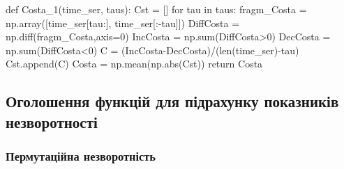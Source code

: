 \documentclass[
  letterpaper,
]{report}
\newenvironment{Shaded}{\begin{snugshade}}{\end{snugshade}}
\newcommand{\BuiltInTok}[1]{\textcolor[rgb]{0.00,0.23,0.31}{#1}}
\newcommand{\ControlFlowTok}[1]{\textcolor[rgb]{0.00,0.23,0.31}{#1}}
\newcommand{\DecValTok}[1]{\textcolor[rgb]{0.68,0.00,0.00}{#1}}
\newcommand{\KeywordTok}[1]{\textcolor[rgb]{0.00,0.23,0.31}{#1}}
\newcommand{\NormalTok}[1]{\textcolor[rgb]{0.00,0.23,0.31}{#1}}
\newcommand{\OperatorTok}[1]{\textcolor[rgb]{0.37,0.37,0.37}{#1}}
\begin{document}
\begin{Shaded}
\begin{Highlighting}[]
\KeywordTok{def}\NormalTok{ Costa\_1(time\_ser, taus):}
\NormalTok{    Cst }\OperatorTok{=}\NormalTok{ []}
    \ControlFlowTok{for}\NormalTok{ tau }\KeywordTok{in}\NormalTok{ taus:}
\NormalTok{        fragm\_Costa }\OperatorTok{=}\NormalTok{ np.array([time\_ser[tau:], time\_ser[:}\OperatorTok{{-}}\NormalTok{tau]])}
\NormalTok{        DiffCosta }\OperatorTok{=}\NormalTok{ np.diff(fragm\_Costa,axis}\OperatorTok{=}\DecValTok{0}\NormalTok{)}
\NormalTok{        IncCosta }\OperatorTok{=}\NormalTok{ np.}\BuiltInTok{sum}\NormalTok{(DiffCosta}\OperatorTok{\textgreater{}}\DecValTok{0}\NormalTok{)}
\NormalTok{        DecCosta }\OperatorTok{=}\NormalTok{ np.}\BuiltInTok{sum}\NormalTok{(DiffCosta}\OperatorTok{\textless{}}\DecValTok{0}\NormalTok{)}
\NormalTok{        C }\OperatorTok{=}\NormalTok{ (IncCosta}\OperatorTok{{-}}\NormalTok{DecCosta)}\OperatorTok{/}\NormalTok{(}\BuiltInTok{len}\NormalTok{(time\_ser)}\OperatorTok{{-}}\NormalTok{tau)}
\NormalTok{        Cst.append(C)}
\NormalTok{    Costa }\OperatorTok{=}\NormalTok{ np.mean(np.}\BuiltInTok{abs}\NormalTok{(Cst))}
    \ControlFlowTok{return}\NormalTok{ Costa}
\end{Highlighting}
\end{Shaded}

\hypertarget{ux43eux433ux43eux43bux43eux448ux435ux43dux43dux44f-ux444ux443ux43dux43aux446ux456ux439-ux434ux43bux44f-ux43fux456ux434ux440ux430ux445ux443ux43dux43aux443-ux43fux43eux43aux430ux437ux43dux438ux43aux456ux432-ux43dux435ux437ux432ux43eux440ux43eux442ux43dux43eux441ux442ux456}{%
\subsection{Оголошення функцій для підрахунку показників
незворотності}\label{ux43eux433ux43eux43bux43eux448ux435ux43dux43dux44f-ux444ux443ux43dux43aux446ux456ux439-ux434ux43bux44f-ux43fux456ux434ux440ux430ux445ux443ux43dux43aux443-ux43fux43eux43aux430ux437ux43dux438ux43aux456ux432-ux43dux435ux437ux432ux43eux440ux43eux442ux43dux43eux441ux442ux456}}

\hypertarget{ux43fux435ux440ux43cux443ux442ux430ux446ux456ux439ux43dux430-ux43dux435ux437ux432ux43eux440ux43eux442ux43dux456ux441ux442ux44c}{%
\subsubsection{Пермутаційна
незворотність}\label{ux43fux435ux440ux43cux443ux442ux430ux446ux456ux439ux43dux430-ux43dux435ux437ux432ux43eux440ux43eux442ux43dux456ux441ux442ux44c}}
\end{document}
